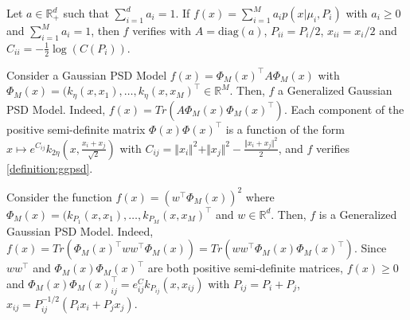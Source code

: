 \begin{example}
Let $a\in\mathbb R^d_+$ such that $\sum_{i=1}^d a_i=1$. If $f(x) = \sum_{i=1}^M a_i p(x | \mu_i, P_i)$ with $a_i \geq 0$ and $\sum_{i=1}^Ma_i = 1$, then $f$ verifies  with $A=\text{diag}(a)$, $P_{ii} = P_i/2$, $x_{ii}=x_i/2$ and $C_{ii} = - \frac{1}{2}\log(C(P_i))$.
\end{example}

\begin{example}
Consider a Gaussian PSD Model $f(x) = \Phi_M(x)^\top  A \Phi_M(x)$ with $\Phi_M(x) = (k_\eta(x, x_1), \ldots, k_\eta(x, x_M)^\top\in\mathbb R^M$. Then, $f$ a Generalized Gaussian PSD Model. Indeed,
$f(x) = Tr(A \Phi_M(x) \Phi_M(x)^\top )$.
Each component of the positive semi-definite matrix $\Phi(x)\Phi(x)^\top $ is a function of the form $x \mapsto e^{C_{ij}}k_{2\eta}(x, \frac{x_i + x_j}{\sqrt{2}})$ with $C_{ij}=\Vert x_i\Vert^2 + \Vert x_j \Vert^2 -\frac{\Vert x_i + x_j\Vert^2}{2}$, and $f$ verifies \cref{definition:ggpsd}.
\end{example}
\begin{example}
Consider the function $f(x) = \left( w^\top \Phi_M(x)\right)^2$ where $\Phi_M(x) = (k_{P_1}(x, x_1), \ldots, k_{P_M}(x, x_M)^\top $ and $w\in\mathbb R^d$. Then, $f$ is a Generalized Gaussian PSD Model. Indeed, $f(x) = Tr\left(\Phi_M(x)^\top ww^\top \Phi_M(x)\right)=Tr\left(ww^\top  \Phi_M(x)\Phi_M(x)^\top \right)$. Since $ww^\top $ and $\Phi_M(x)\Phi_M(x)^\top $ are both positive semi-definite matrices, $f(x)\geq 0$ and $\Phi_M(x)\Phi_M(x)^\top _{ij}=e^C_{ij}k_{P_{ij}}(x, x_{ij})$ with $P_{ij} = P_i + P_j$, $x_{ij} = P_{ij}^{-1/2}\left(P_ix_i + P_jx_j\right)$.
\end{example}


